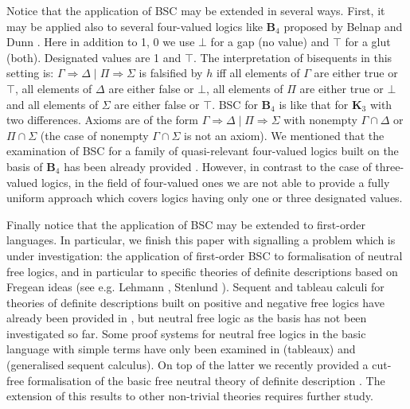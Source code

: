 \documentclass[10pt,a4paper]{article}
\theoremstyle{definition}
\newcommand{\3}{\vspace{.3in}}
\newcommand{\2}{\vspace{.2in}}
\newcommand{\1}{\vspace{.1in}}
\newcommand{\5}{\vspace{.05in}}
\begin{document}
Notice that the application of BSC may be extended in several ways. First, it may be applied also to several four-valued logics like {\bf B$_4$} proposed by Belnap \cite{Belnap77a,Belnap77b} and Dunn \cite{Dunn76}. Here in addition to 1, 0 we use $\bot $ for a gap (no value) and $\top $ for a glut (both). Designated values are 1 and $\top $.
The interpretation of bisequents in this setting is: $\Gamma\Rightarrow\Delta \mid \Pi\Rightarrow\Sigma$ is falsified by $h$ iff all elements of $\Gamma$ are either true or $\top$, all elements of $\Delta$ are either false or $\bot$, all elements of $\Pi$ are either true or $\bot$ and all elements of $\Sigma$ are either false or $\top$.  BSC for {\bf B$_4$} is like that for {\bf K$_3$} with two differences. Axioms are of the form $\Gamma\Rightarrow\Delta \mid \Pi\Rightarrow\Sigma$ with nonempty  $\Gamma\cap\Delta$ or $\Pi\cap\Sigma$ (the case of nonempty $\Gamma\cap\Sigma$ is not an axiom). 
We mentioned that the examination of BSC for a family of quasi-relevant four-valued logics built on the basis of {\bf B$_4$} has been already provided \cite{Indrzejczak3}. However, in contrast to the case of three-valued logics, in the field of four-valued ones we are not able to provide a fully uniform approach which covers logics having only one or three designated values.


Finally notice that the application of BSC may be extended to first-order languages.  In particular, we finish this paper with signalling a problem which is under investigation: the application of first-order BSC to formalisation of neutral free logics, and in particular to specific theories of definite descriptions based on Fregean ideas (see e.g. Lehmann \cite{Lehmann}, Stenlund \cite{Stenlund}). 
Sequent and tableau calculi for theories of definite descriptions built on positive and negative free logics have already been provided in \cite{Indrzejczak2020b,Indrzejczak2021c,IndZaw1}, but neutral free logic as the basis has not been investigated so far. Some proof systems for neutral free logics in the basic language with simple terms have only been examined in \cite{Lehmann} (tableaux) and \cite{PavlovicGratzl23} (generalised sequent calculus). On top of the latter we recently provided a cut-free formalisation of the basic free neutral theory of definite description \cite{IndPet}. The extension of this results to other non-trivial theories requires further study.



\bigskip
\end{document}

